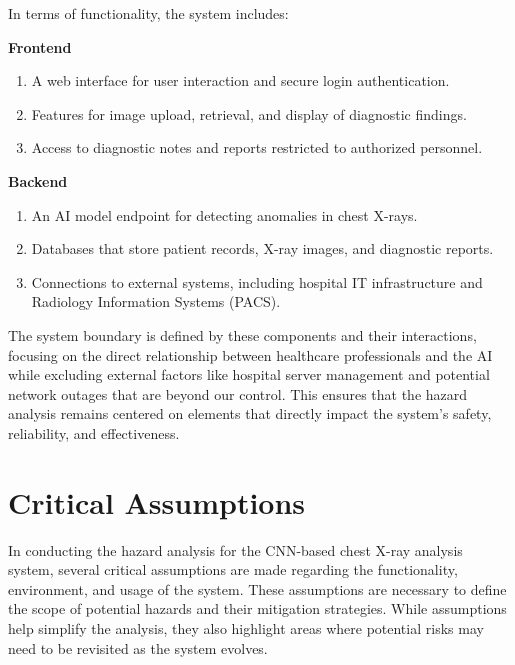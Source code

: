 \documentclass{article}
\begin{document}
In terms of functionality, the system includes:

\textbf{Frontend}
\begin{enumerate}
  \item A web interface for user interaction and secure login authentication.
  \item Features for image upload, retrieval, and display of diagnostic findings.
  \item Access to diagnostic notes and reports restricted to authorized personnel.
\end{enumerate}

\textbf{Backend}
\begin{enumerate}
  \item An AI model endpoint for detecting anomalies in chest X-rays.
  \item Databases that store patient records, X-ray images, and diagnostic reports.
  \item Connections to external systems, including hospital IT infrastructure and Radiology
    Information Systems (PACS).
\end{enumerate}

The system boundary is defined by these components and their interactions, focusing on the direct
relationship between healthcare professionals and the AI while excluding external factors like
hospital server management and potential network outages that are beyond our control. This
ensures that the hazard analysis remains centered on elements that directly impact the system's
safety, reliability, and effectiveness.

\section{Critical Assumptions}

In conducting the hazard analysis for the CNN-based chest X-ray analysis system, several critical
assumptions are made regarding the functionality, environment, and usage of the system. These
assumptions are necessary to define the scope of potential hazards and their mitigation
strategies. While assumptions help simplify the analysis, they also highlight areas where
potential risks may need to be revisited as the system evolves.
\end{document}
